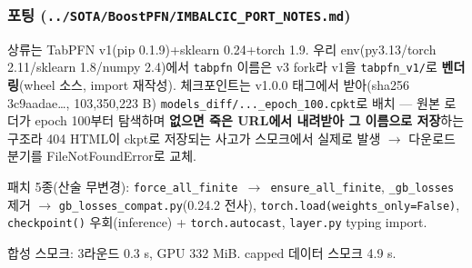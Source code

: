 \subsubsection{포팅 (\texttt{.\allowbreak{}.\allowbreak{}/\allowbreak{}\allowbreak{}SOTA/\allowbreak{}\allowbreak{}BoostPFN\allowbreak{}/\allowbreak{}\allowbreak{}IMBALCI\allowbreak{}C\_\allowbreak{}\allowbreak{}PORT\_\allowbreak{}\allowbreak{}N\allowbreak{}OTES.\allowbreak{}md})}
\par\noindent \textbullet\enspace 상류는 TabPFN v1(pip 0.1.9)+\allowbreak{}sklearn 0.24+\allowbreak{}torch 1.9. 우리 env(py3.13/\allowbreak{}torch 2.11/\allowbreak{}sklearn 1.8/\allowbreak{}numpy 2.4)에서 \texttt{tabpfn} 이름은 v3 fork라 v1을 \texttt{tabpfn\_\allowbreak{}\allowbreak{}v\allowbreak{}1/\allowbreak{}\allowbreak{}}로 \textbf{벤더링}(wheel 소스, import 재작성). 체크포인트는 v1.0.0 태그에서 받아(sha256 3c9aadae…, 103,350,223 B) \texttt{models\_\allowbreak{}\allowbreak{}d\allowbreak{}iff/\allowbreak{}\allowbreak{}.\allowbreak{}.\allowbreak{}.\allowbreak{}\_\allowbreak{}\allowbreak{}epoch\_\allowbreak{}\allowbreak{}10\allowbreak{}0.\allowbreak{}cpkt}로 배치 — 원본 로더가 epoch 100부터 탐색하며 \textbf{없으면 죽은 URL에서 내려받아 그 이름으로 저장}하는 구조라 404 HTML이 ckpt로 저장되는 사고가 스모크에서 실제로 발생  \ensuremath{\rightarrow}  다운로드 분기를 FileNotFoundError로 교체.


\par\noindent \textbullet\enspace 패치 5종(산술 무변경): \texttt{force\_\allowbreak{}\allowbreak{}al\allowbreak{}l\_\allowbreak{}\allowbreak{}finite\allowbreak{}  \ensuremath{\rightarrow}  ensur\allowbreak{}e\_\allowbreak{}\allowbreak{}all\_\allowbreak{}\allowbreak{}fi\allowbreak{}nite}, \texttt{\_\allowbreak{}\allowbreak{}gb\_\allowbreak{}\allowbreak{}loss\allowbreak{}es} 제거  \ensuremath{\rightarrow}  \texttt{gb\_\allowbreak{}\allowbreak{}losse\allowbreak{}s\_\allowbreak{}\allowbreak{}compat\allowbreak{}.\allowbreak{}py}(0.24.2 전사), \texttt{torch.\allowbreak{}lo\allowbreak{}ad(weigh\allowbreak{}ts\_\allowbreak{}\allowbreak{}only=\allowbreak{}\allowbreak{}False)}, \texttt{checkpoi\allowbreak{}nt()} 우회(inference) +\allowbreak{} \texttt{torch.\allowbreak{}au\allowbreak{}tocast}, \texttt{layer.\allowbreak{}py\allowbreak{}} typing import.


\par\noindent \textbullet\enspace 합성 스모크: 3라운드 0.3 s, GPU 332 MiB. capped 데이터 스모크 4.9 s.


